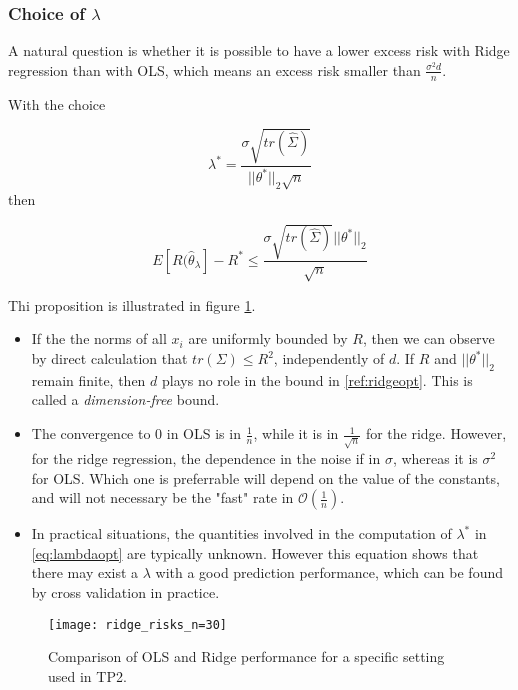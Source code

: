 \documentclass[
10pt, %
a4paper, %
oneside, %
headinclude,footinclude, %
BCOR5mm, %
]{scrartcl}
\begin{document}
\subsubsection{\large\color{Periwinkle}Choice of $\lambda$}

A natural question is whether it is possible to have a lower excess risk with Ridge regression than with OLS, which means an excess risk smaller than $ \frac{\sigma^2d}{n} $.

\begin{proposition}
    With the choice 

    \begin{equation}
	\label{eq:lambdaopt}
	\lambda^* = \frac{\sigma \sqrt{tr( \hat{\Sigma})}}{||\theta^*||_2 \sqrt{n} } 
    \end{equation}
    then

    \begin{equation}
	\label{ref:ridgeopt}
	E[ R( \hat{\theta}_{\lambda}]-R^*\leq \frac{\sigma \sqrt{tr( \hat{\Sigma})}||\theta^*||_2 }{ \sqrt{n} } 
    \end{equation}
\end{proposition}

Thi proposition is illustrated in figure \ref{fig:ridge_risks_n=30}.

\begin{itemize}
    \item If the the norms of all $x_i$ are uniformly bounded by $R$, then we can observe by direct calculation that $tr( \Sigma)\leq R^2$, independently of $d$. If $R$ and $||\theta^*||_2$ remain finite, then $d$ plays no role in  the bound in \ref{ref:ridgeopt}. This is called a \textit{{dimension-free}} bound.
    \item The convergence to $0$ in OLS is in $ \frac{1}{n} $, while it is  in $ \frac{1}{ \sqrt{n} }$ for the ridge. However, for the ridge regression, the dependence in the noise if in $\sigma$, whereas it is $\sigma^2$ for OLS. Which one is preferrable will depend on the value of the constants, and will not necessary be the "fast" rate in $ \mathcal{O} ( \frac{1}{n} )$.
    \item In practical situations, the quantities involved in the computation
        of $\lambda^*$ in  \ref{eq:lambdaopt} are typically unknown. However
        this equation shows that there may exist a $\lambda$ with a good prediction performance, which can be found by cross validation in practice.
\end{itemize}

\begin{figure}[htpb]
    \centering
    \texttt{[image: ridge\_risks\_n=30]}
    \caption{Comparison of OLS and Ridge performance for a specific setting
    used in TP2.}
    \label{fig:ridge_risks_n=30}
\end{figure}
\end{document}
